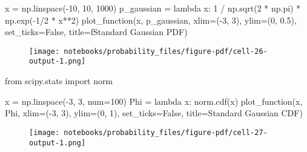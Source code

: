 \documentclass[
  letterpaper,
  DIV=11,
  numbers=noendperiod]{scrreprt}
\newenvironment{Shaded}{\begin{snugshade}}{\end{snugshade}}
\newcommand{\DecValTok}[1]{\textcolor[rgb]{0.68,0.00,0.00}{#1}}
\newcommand{\FloatTok}[1]{\textcolor[rgb]{0.68,0.00,0.00}{#1}}
\newcommand{\ImportTok}[1]{\textcolor[rgb]{0.00,0.46,0.62}{#1}}
\newcommand{\KeywordTok}[1]{\textcolor[rgb]{0.00,0.23,0.31}{#1}}
\newcommand{\NormalTok}[1]{\textcolor[rgb]{0.00,0.23,0.31}{#1}}
\newcommand{\OperatorTok}[1]{\textcolor[rgb]{0.37,0.37,0.37}{#1}}
\newcommand{\SpecialStringTok}[1]{\textcolor[rgb]{0.13,0.47,0.30}{#1}}
\newcommand{\StringTok}[1]{\textcolor[rgb]{0.13,0.47,0.30}{#1}}
\newcommand{\VariableTok}[1]{\textcolor[rgb]{0.07,0.07,0.07}{#1}}
\begin{document}
\begin{Shaded}
\begin{Highlighting}[]
\NormalTok{x }\OperatorTok{=}\NormalTok{ np.linspace(}\OperatorTok{{-}}\DecValTok{10}\NormalTok{, }\DecValTok{10}\NormalTok{, }\DecValTok{1000}\NormalTok{)}
\NormalTok{p\_gaussian }\OperatorTok{=} \KeywordTok{lambda}\NormalTok{ x: }\DecValTok{1} \OperatorTok{/}\NormalTok{ np.sqrt(}\DecValTok{2} \OperatorTok{*}\NormalTok{ np.pi) }\OperatorTok{*}\NormalTok{ np.exp(}\OperatorTok{{-}}\DecValTok{1}\OperatorTok{/}\DecValTok{2} \OperatorTok{*}\NormalTok{ x}\OperatorTok{**}\DecValTok{2}\NormalTok{)}
\NormalTok{plot\_function(x, p\_gaussian, xlim}\OperatorTok{=}\NormalTok{(}\OperatorTok{{-}}\DecValTok{3}\NormalTok{, }\DecValTok{3}\NormalTok{), ylim}\OperatorTok{=}\NormalTok{(}\DecValTok{0}\NormalTok{, }\FloatTok{0.5}\NormalTok{), set\_ticks}\OperatorTok{=}\VariableTok{False}\NormalTok{,}
\NormalTok{              title}\OperatorTok{=}\SpecialStringTok{f\textquotesingle{}Standard Gaussian PDF\textquotesingle{}}\NormalTok{)}
\end{Highlighting}
\end{Shaded}

\begin{figure}[H]

{\centering \texttt{[image: notebooks/probability\_files/figure-pdf/cell-26-output-1.png]}

}

\end{figure}

\begin{Shaded}
\begin{Highlighting}[]
\ImportTok{from}\NormalTok{ scipy.stats }\ImportTok{import}\NormalTok{ norm}

\NormalTok{x }\OperatorTok{=}\NormalTok{ np.linspace(}\OperatorTok{{-}}\DecValTok{3}\NormalTok{, }\DecValTok{3}\NormalTok{, num}\OperatorTok{=}\DecValTok{100}\NormalTok{)}
\NormalTok{Phi }\OperatorTok{=} \KeywordTok{lambda}\NormalTok{ x: norm.cdf(x)}
\NormalTok{plot\_function(x, Phi, xlim}\OperatorTok{=}\NormalTok{(}\OperatorTok{{-}}\DecValTok{3}\NormalTok{, }\DecValTok{3}\NormalTok{), ylim}\OperatorTok{=}\NormalTok{(}\DecValTok{0}\NormalTok{, }\DecValTok{1}\NormalTok{), set\_ticks}\OperatorTok{=}\VariableTok{False}\NormalTok{, title}\OperatorTok{=}\StringTok{\textquotesingle{}Standard Gaussian CDF\textquotesingle{}}\NormalTok{)}
\end{Highlighting}
\end{Shaded}

\begin{figure}[H]

{\centering \texttt{[image: notebooks/probability\_files/figure-pdf/cell-27-output-1.png]}

}

\end{figure}
\end{document}
